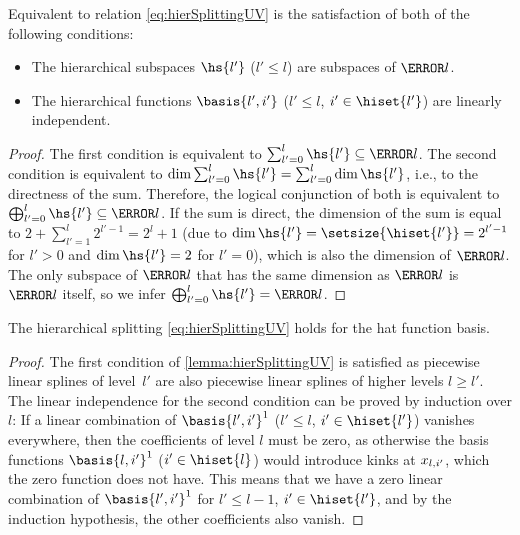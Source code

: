 \begin{lemma}
  \label{lemma:hierSplittingUV}
  Equivalent to relation \eqref{eq:hierSplittingUV} is the satisfaction of
  both of the following conditions:
  \begin{itemize}
    \item
    The hierarchical subspaces $\hs{l'}$ ($l' \le l$) are subspaces of $\ns{l}$.
    
    \item
    The hierarchical functions
    $\basis{l',i'}$ ($l' \le l$, $i' \in \hiset{l'}$) are linearly independent.
  \end{itemize}
\end{lemma}
\begin{proof}
  The first condition is equivalent to $\sum_{l'=0}^l \hs{l'} \subset \ns{l}$.
  The second condition is equivalent to
  $\dim \sum_{l'=0}^l \hs{l'} = \sum_{l'=0}^l \dim \hs{l'}$,
  i.e., to the directness of the sum.
  Therefore, the logical conjunction of both is equivalent to
  $\bigoplus_{l'=0}^l \hs{l'} \subset \ns{l}$.
  If the sum is direct,
  the dimension of the sum is equal to $2 + \sum_{l'=1}^l 2^{l'-1} = 2^l + 1$
  (due to $\dim \hs{l'} = \setsize{\hiset{l'}} = 2^{l'-1}$ for $l' > 0$ and
  $\dim \hs{l'} = 2$ for $l' = 0$),
  which is also the dimension of $\ns{l}$.
  The only subspace of $\ns{l}$ that has the same dimension as $\ns{l}$ is $\ns{l}$ itself,
  so we infer $\bigoplus_{l'=0}^l \hs{l'} = \ns{l}$.
\end{proof}
\begin{corollary}
  The hierarchical splitting \eqref{eq:hierSplittingUV}
  holds for the hat function basis.
\end{corollary}
\begin{proof}
  The first condition of \cref{lemma:hierSplittingUV}
  is satisfied as piecewise linear splines of level~$l'$
  are also piecewise linear splines of higher levels $l \ge l'$.
  The linear independence for the second condition can be proved by induction
  over $l$:
  If a linear combination of $\basis{l',i'}^1$ ($l' \le l$, $i' \in \hiset{l'}$)
  vanishes everywhere, then the coefficients of level $l$ must be zero,
  as otherwise the basis functions $\basis{l,i'}^1$ ($i' \in \hiset{l}$) would
  introduce kinks at $x_{l,i'}$, which the zero function does not have.
  This means that we have a zero linear combination of $\basis{l',i'}^1$ for
  $l' \le l - 1$, $i' \in \hiset{l'}$,
  and by the induction hypothesis, the other coefficients also vanish.
\end{proof}



